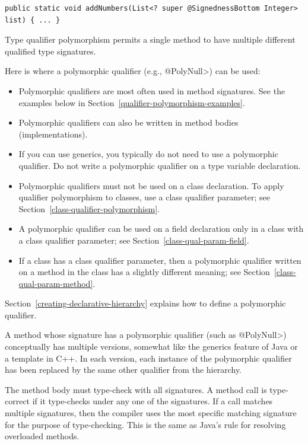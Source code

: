 \begin{Verbatim}
public static void addNumbers(List<? super @SignednessBottom Integer> list) { ... }
\end{Verbatim}


\label{qualifier-polymorphism}

Type qualifier polymorphism permits a single method to have multiple different qualified
type signatures.

Here is where a polymorphic qualifier (e.g., \<@PolyNull>) can be used:
\begin{itemize}
\item Polymorphic qualifiers are most often used in method signatures.
  See the examples below in Section~\ref{qualifier-polymorphism-examples}.
\item Polymorphic qualifiers can also be written in method bodies
  (implementations).
\item If you can use generics, you typically do not need to use a
  polymorphic qualifier.  Do not write a polymorphic qualifier on a type
  variable declaration.
\item Polymorphic qualifiers must not be used on a class declaration.
  To apply qualifier polymorphism to classes, use a class qualifier
  parameter; see Section~\ref{class-qualifier-polymorphism}.
\item A polymorphic qualifier can be used on a field declaration only in a
  class with a class qualifier parameter; see Section~\ref{class-qual-param-field}.
\item If a class has a class qualifier parameter, then a polymorphic
  qualifier written on a method in the class has a slightly different
  meaning; see Section~\ref{class-qual-param-method}.
\end{itemize}

Section~\ref{creating-declarative-hierarchy} explains how to define a
polymorphic qualifier.



A method whose signature has a polymorphic qualifier (such as \<@PolyNull>) conceptually has multiple
versions, somewhat like the generics feature of Java or a template in C++.
In each version, each instance of the polymorphic qualifier has been
replaced by the same other qualifier from the hierarchy.

The method body must type-check with all signatures.  A method call is
type-correct if it type-checks under any one of the signatures.  If a call
matches multiple signatures, then the compiler uses the most specific
matching signature for the purpose of type-checking.  This is the same as
Java's rule for resolving overloaded methods.


